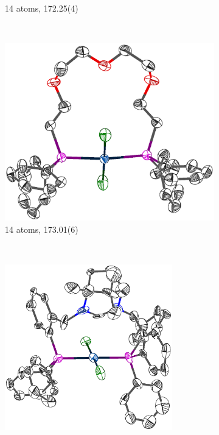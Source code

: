 \begin{figure}[htbp]
\begin{subfigure}[b]{0.3\textwidth}
                \caption{14 atoms, 172.25(4)\degrees{}\cite{Beuken1997}}
                \label{NURGAI}
        \end{subfigure}
       \\
        \begin{subfigure}[b]{0.4\textwidth}
                \includegraphics[width=\textwidth]{../Othercrystals/PtCl2/Trans/661699.eps}
                \caption{14 atoms, 173.01(6)\degrees{}\cite{Owens2008}}
                \label{HOJDUG}
        \end{subfigure}%
        ~
        \begin{subfigure}[b]{0.4\textwidth}
                \includegraphics[width=0.8\textwidth]{../Othercrystals/PtCl2/Trans/891177.eps}

\end{subfigure}
\end{figure}
